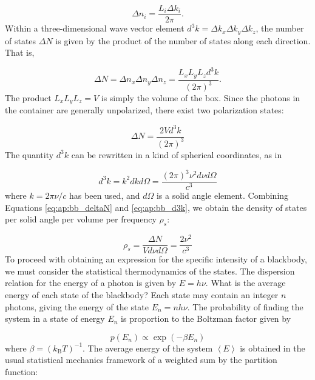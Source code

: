 \documentclass[12pt]{article}
\newcommand{\bigparenthesis}[1]{\left(#1\right)}
\begin{document}
\begin{equation}
    \Delta n_i = \frac{L_i \Delta k_i}{2\pi}.
\end{equation}
%
Within a three-dimensional wave vector element $d^3k = \Delta k_x \Delta k_y \Delta k_z$, the number of states $\Delta N$ is given by the product of the number of states along each direction. That is,

\begin{equation}
    \Delta N = \Delta n_x \Delta n_y \Delta n_z = \frac{L_x L_y L_z d^3 k}{(2\pi)^3}.
\end{equation}
%
The product $L_x L_y L_z = V$ is simply the volume of the box. Since the photons in the container are generally unpolarized, there exist two polarization states:

\begin{equation}
    \Delta N = \frac{2Vd^3 k}{(2\pi)^3} \label{eq:ap:bb_deltaN}
\end{equation}
%
The quantity $d^3 k$ can be rewritten in a kind of spherical coordinates, as in

\begin{equation}
    d^3 k = k^2 dk d\Omega = \frac{(2\pi)^3 \nu^2 d\nu d\Omega}{c^3} \label{eq:ap:bb_d3k}
\end{equation}
%
where $k = 2\pi\nu/c$ has been used, and $d\Omega$ is a solid angle element. Combining Equations \ref{eq:ap:bb_deltaN} and \ref{eq:ap:bb_d3k}, we obtain the density of states per solid angle per volume per frequency $\rho_s$:

\begin{equation}
    \rho_s = \frac{\Delta N}{Vd\nu d\Omega} = \frac{2\nu^2}{c^3}
\end{equation}
%
To proceed with obtaining an expression for the specific intensity of a blackbody, we must consider the statistical thermodynamics of the states. The dispersion relation for the energy of a photon is given by $E = h\nu$. What is the average energy of each state of the blackbody? Each state may contain an integer $n$ photons, giving the energy of the state $E_n = nh\nu$. The probability of finding the system in a state of energy $E_n$ is proportion to the Boltzman factor given by

\begin{equation}
p(E_n) \propto \exp\bigparenthesis{-\beta E_n}    
\end{equation}
%
where $\beta = (k_\mathrm{B}T)^{-1}$. The average energy of the system $\left< E \right>$ is obtained in the usual statistical mechanics framework of a weighted sum by the partition function:
\end{document}
